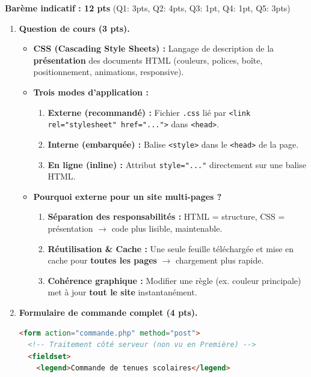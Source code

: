 \documentclass[11pt]{article}
\begin{document}
\begin{corrige}
\textbf{Barème indicatif : 12 pts} (Q1: 3pts, Q2: 4pts, Q3: 1pt, Q4: 1pt, Q5: 3pts)

\begin{enumerate}
  \item \textbf{Question de cours (3 pts).}
  \begin{itemize}
    \item \textbf{CSS (Cascading Style Sheets) :} Langage de description de la \textbf{présentation} des documents HTML (couleurs, polices, boîte, positionnement, animations, responsive).
    \item \textbf{Trois modes d'application :}
      \begin{enumerate}
        \item \textbf{Externe (recommandé) :} Fichier \texttt{.css} lié par \texttt{<link rel="stylesheet" href="...">} dans \texttt{<head>}.
        \item \textbf{Interne (embarquée) :} Balise \texttt{<style>} dans le \texttt{<head>} de la page.
        \item \textbf{En ligne (inline) :} Attribut \texttt{style="..."} directement sur une balise HTML.
      \end{enumerate}
    \item \textbf{Pourquoi externe pour un site multi-pages ?} 
      \begin{enumerate}
        \item \textbf{Séparation des responsabilités :} HTML = structure, CSS = présentation $\to$ code plus lisible, maintenable.
        \item \textbf{Réutilisation \& Cache :} Une seule feuille téléchargée et mise en cache pour \textbf{toutes les pages} $\to$ chargement plus rapide.
        \item \textbf{Cohérence graphique :} Modifier une règle (ex. couleur principale) met à jour \textbf{tout le site} instantanément.
      \end{enumerate}
  \end{itemize}
  
  \item \textbf{Formulaire de commande complet (4 pts).}
\begin{lstlisting}[language=HTML]
<form action="commande.php" method="post">
  <!-- Traitement côté serveur (non vu en Première) -->
  <fieldset>
    <legend>Commande de tenues scolaires</legend>
    

\end{lstlisting}
\end{enumerate}
\end{corrige}
\end{document}
